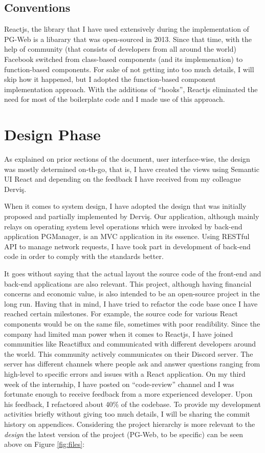 \subsection{Conventions}

Reactjs, the library that I have used extensively during the implementation 
of PG-Web is a libarary that was open-sourced in 2013. Since that time, 
with the help of community (that consists of developers from all around the 
world) Facebook switched from class-based components (and its implemenation) 
to function-based components. For sake of not getting into too much details, 
I will skip how it happened, but I adopted the function-based component 
implementation approach. With the additions of ``hooks'', Reactjs eliminated 
the need for most of the boilerplate code and I made use of this approach.

\section{Design Phase}
As explained on prior sections of the document, user interface-wise, the 
design was mostly determined on-th-go, that is, I have created the views 
using Semantic UI React and depending on the feedback I have received from 
my colleague Derviş.
\par
When it comes to system design, I have adopted the design that was initially 
proposed and partially implemented by Derviş. Our application, although 
mainly relays on operating system level operations which were invoked by 
back-end application PGManager, is an MVC application in its essence. 
Using RESTful API to manage network requests, I have took part in 
development of back-end code in order to comply with the standards better.
\par
It goes without saying that the actual layout the source code of the 
front-end and back-end applications are also relevant. This project, 
although having financial concerns and economic value, is also intended 
to be an open-source project in the long run. Having that in mind, I have 
tried to refactor the code base once I have reached certain milestones. 
For example, the source code for various React components would be on the 
same file, sometimes with poor readibility. Since the company had limited 
man power when it comes to Reactjs, I have joined communities like Reactiflux 
and communicated with different developers around the world. This community 
actively communicates on their Discord server. The server has different 
channels where people ask and answer questions ranging from high-level to 
specific errors and issues with a React application. On my third week of the 
internship, I have posted on ``code-review'' channel and I was fortunate 
enough to receive feedback from a more experienced developer. Upon his 
feedback, I refactored about 40\% of the codebase. To provide my development 
activities briefly without giving too much details, I will be sharing the 
commit history on appendices. Considering the project hierarchy is more 
relevant to the \textit{design} the latest version of the project 
(PG-Web, to be specific) can be seen above on Figure \ref{fig:files}:

